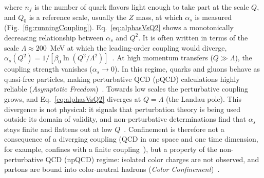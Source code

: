 %
%
%
%
%
%
where \(n_f\) is the number of quark flavors light enough to take part at the scale \(Q\), and \(Q_0\) is a reference scale, usually the \(Z\) mass, at which \(\alpha_s\) is measured (Fig.~\ref{fig:runningCoupling}).
%
Eq.~\ref{eq:alphasVsQ2} shows a monotonically decreasing relationship between \(\alpha_s\) and \(Q^2\).
%
It is often written in terms of the scale \(\Lambda \approx 200\)~MeV at which the leading-order coupling would diverge, \(\alpha_s(Q^2) = 1/[\beta_0 \ln(Q^2/\Lambda^2)]\)~\cite{ParticleDataGroup:2026aaa}.
%
At high momentum transfers (\(Q \gg \Lambda\)), the coupling strength vanishes ($\alpha_s \to 0$). 
%
In this regime, quarks and gluons behave as quasi-free particles, making perturbative QCD (pQCD) calculations highly reliable (\emph{Asymptotic Freedom})~\cite{PhysRevLett.30.1343,PhysRevLett.30.1346}.  
%
Towards low scales the perturbative coupling grows, and Eq.~\ref{eq:alphasVsQ2} diverges at \(Q = \Lambda\) (the Landau pole).
%
This divergence is not physical: it signals that perturbation theory is being used outside its domain of validity, and non-perturbative determinations find that \(\alpha_s\) stays finite and flattens out at low \(Q\)~\cite{Deur:2016tte}.
%
Confinement is therefore not a consequence of a diverging coupling (QCD in one space and one time dimension, for example, confines with a finite coupling~\cite{Deur:2016tte}), but a property of the non-perturbative QCD (npQCD) regime: isolated color charges are not observed, and partons are bound into color-neutral hadrons (\emph{Color Confinement})~\cite{Wilson:1974sk}.

